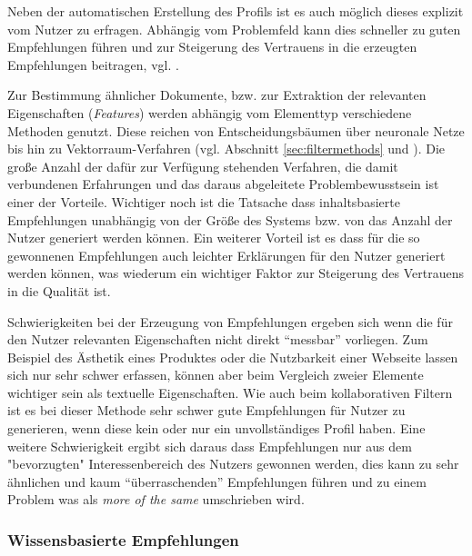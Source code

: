 Neben der automatischen Erstellung des Profils ist es auch möglich dieses explizit vom Nutzer zu erfragen. Abhängig vom Problemfeld kann dies schneller zu guten Empfehlungen führen und zur Steigerung des Vertrauens in die erzeugten Empfehlungen beitragen, vgl. \citep{hb_20}.

Zur Bestimmung ähnlicher Dokumente, bzw. zur Extraktion der relevanten Eigenschaften (\textit{Features}) werden abhängig vom Elementtyp verschiedene Methoden genutzt. Diese reichen von Entscheidungsbäumen über neuronale Netze bis hin zu Vektorraum-Verfahren (vgl. Abschnitt \ref{sec:filtermethods} und \citep[Kap. 3]{rs}). Die große Anzahl der dafür zur Verfügung stehenden Verfahren, die damit verbundenen Erfahrungen und das daraus abgeleitete Problembewusstsein ist einer der Vorteile. Wichtiger noch ist die Tatsache dass inhaltsbasierte Empfehlungen unabhängig von der Größe des Systems bzw. von das Anzahl der Nutzer generiert werden können. Ein weiterer Vorteil ist es dass für die so gewonnenen Empfehlungen auch leichter Erklärungen für den Nutzer generiert werden können, was wiederum ein wichtiger Faktor zur Steigerung des Vertrauens in die Qualität ist.

Schwierigkeiten bei der Erzeugung von Empfehlungen ergeben sich wenn die für den Nutzer relevanten Eigenschaften nicht direkt ``messbar'' vorliegen. Zum Beispiel des Ästhetik eines Produktes oder die Nutzbarkeit einer Webseite lassen sich nur sehr schwer erfassen, können aber beim Vergleich zweier Elemente wichtiger sein als textuelle Eigenschaften. Wie auch beim kollaborativen Filtern ist es bei dieser Methode sehr schwer gute Empfehlungen für Nutzer zu generieren, wenn diese kein oder nur ein unvollständiges Profil haben. Eine weitere Schwierigkeit ergibt sich daraus dass Empfehlungen nur aus dem "bevorzugten" Interessenbereich des Nutzers gewonnen werden, dies kann zu sehr ähnlichen und kaum ``überraschenden'' Empfehlungen führen und zu einem Problem was als \textit{more of the same} umschrieben wird.  \citep[Kap. 3]{rs} \citep{hb_03}


\subsubsection{Wissensbasierte Empfehlungen}

